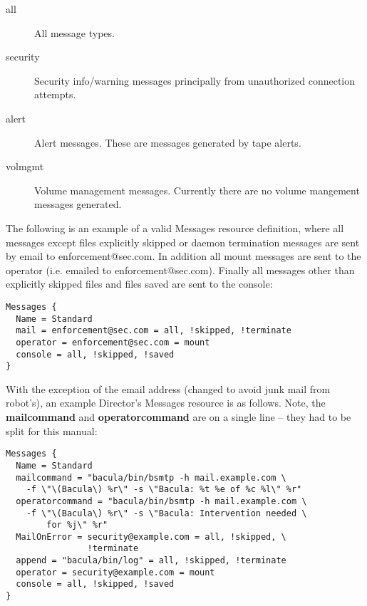 \begin{description}
\begin{description}
\item [all]
   All message types.  

\item [security]
   Security info/warning messages principally from unauthorized      
   connection attempts.

\item [alert]
   Alert messages. These are messages generated by tape alerts.

\item [volmgmt]
   Volume management messages. Currently there are no volume mangement
   messages generated.
\end{description}

\end{description}

The following is an example of a valid Messages resource definition, where
all messages except files explicitly skipped or daemon termination messages
are sent by email to enforcement@sec.com.  In addition all mount messages
are sent to the operator (i.e.  emailed to enforcement@sec.com).  Finally
all messages other than explicitly skipped files and files saved are sent
to the console:

\footnotesize
\begin{verbatim}
Messages {
  Name = Standard
  mail = enforcement@sec.com = all, !skipped, !terminate
  operator = enforcement@sec.com = mount
  console = all, !skipped, !saved
}
\end{verbatim}
\normalsize

With the exception of the email address (changed to avoid junk mail from
robot's), an example Director's Messages resource is as follows. Note, the {\bf
mailcommand} and {\bf operatorcommand} are on a single line -- they had to be
split for this manual: 

\footnotesize
\begin{verbatim}
Messages {
  Name = Standard
  mailcommand = "bacula/bin/bsmtp -h mail.example.com \
    -f \"\(Bacula\) %r\" -s \"Bacula: %t %e of %c %l\" %r"
  operatorcommand = "bacula/bin/bsmtp -h mail.example.com \
    -f \"\(Bacula\) %r\" -s \"Bacula: Intervention needed \
        for %j\" %r"
  MailOnError = security@example.com = all, !skipped, \
                !terminate
  append = "bacula/bin/log" = all, !skipped, !terminate
  operator = security@example.com = mount
  console = all, !skipped, !saved
}
\end{verbatim}
\normalsize
